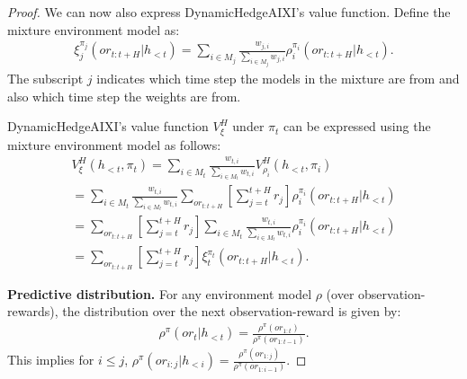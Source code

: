 \begin{proof}
    We can now also express DynamicHedgeAIXI's value function. Define the mixture environment model as:
    \begin{align*}
        \xi_j^{\pi_j}(or_{t:t+H} | h_{<t}) = \sum_{i \in M_j} \frac{w_{j, i}}{\sum_{i \in M_j} w_{j, i}} \rho_i^{\pi_i}(or_{t:t+H} | h_{<t}).
    \end{align*}
    The subscript $j$ indicates which time step the models in the mixture are from and also which time step the weights are from.
    
    DynamicHedgeAIXI's value function $V^{H}_{\xi}$ under $\pi_t$ can be expressed using the mixture environment model as follows:
    \begin{multline*}
        V_{\xi}^{H}(h_{<t}, \pi_t) = \sum_{i \in M_t} \frac{w_{t, i}}{\sum_{i \in M_t} w_{t, i}} V_{\rho_i}^{H}(h_{<t}, \pi_i)\\
        = \sum_{i \in M_t} \frac{w_{t, i}}{\sum_{i \in M_t} w_{t, i}} \sum_{or_{t:t+H}} \left[ \sum_{j=t}^{t+H} r_j \right] \rho_i^{\pi_i}(or_{t:t+H} | h_{<t})\\
        = \sum_{or_{t:t+H}} \left[ \sum_{j=t}^{t+H} r_j \right] \sum_{i \in M_t} \frac{w_{t, i}}{\sum_{i \in M_t} w_{t, i}} \rho_i^{\pi_i}(or_{t:t+H} | h_{<t})\\
        = \sum_{or_{t:t+H}} \left[ \sum_{j=t}^{t+H} r_j \right] \xi_t^{\pi_t}(or_{t:t+H} | h_{<t}).
    \end{multline*}

    \textbf{Predictive distribution.}
    For any environment model $\rho$ (over observation-rewards), the distribution over the next observation-reward is given by:
    \begin{align*}
        \rho^{\pi}(or_t | h_{<t}) = \frac{ \rho^{\pi}(or_{1:t}) }{ \rho^{\pi}(or_{1:t-1}) }.
    \end{align*}
    This implies for $i \leq j$, $\rho^{\pi}(or_{i:j} | h_{<i}) = \frac{ \rho^{\pi}(or_{1:j}) }{ \rho^{\pi}(or_{1:i-1}) }$. 
    

\end{proof}
